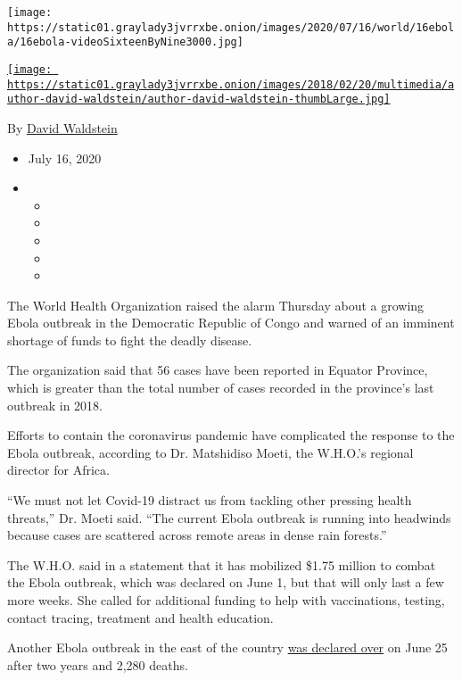\texttt{[image: https://static01.graylady3jvrrxbe.onion/images/2020/07/16/world/16ebola/16ebola-videoSixteenByNine3000.jpg]}

\href{https://www.nytimes3xbfgragh.onion/by/david-waldstein}{\texttt{[image: https://static01.graylady3jvrrxbe.onion/images/2018/02/20/multimedia/author-david-waldstein/author-david-waldstein-thumbLarge.jpg]}}

By \href{https://www.nytimes3xbfgragh.onion/by/david-waldstein}{David
Waldstein}

\begin{itemize}
\item
  July 16, 2020
\item
  \begin{itemize}
  \item
  \item
  \item
  \item
  \item
  \end{itemize}
\end{itemize}

The World Health Organization raised the alarm Thursday about a growing
Ebola outbreak in the Democratic Republic of Congo and warned of an
imminent shortage of funds to fight the deadly disease.

The organization said that 56 cases have been reported in Equator
Province, which is greater than the total number of cases recorded in
the province's last outbreak in 2018.

Efforts to contain the coronavirus pandemic have complicated the
response to the Ebola outbreak, according to Dr. Matshidiso Moeti, the
W.H.O.'s regional director for Africa.

``We must not let Covid-19 distract us from tackling other pressing
health threats,'' Dr. Moeti said. ``The current Ebola outbreak is
running into headwinds because cases are scattered across remote areas
in dense rain forests.''

The W.H.O. said in a statement that it has mobilized \$1.75 million to
combat the Ebola outbreak, which was declared on June 1, but that will
only last a few more weeks. She called for additional funding to help
with vaccinations, testing, contact tracing, treatment and health
education.

Another Ebola outbreak in the east of the country
\href{https://www.nytimes3xbfgragh.onion/2020/06/25/world/africa/ebola-congo-who.html}{was
declared over} on June 25 after two years and 2,280 deaths.

